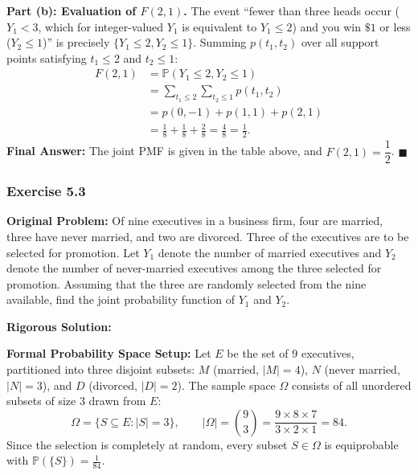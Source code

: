 \documentclass[11pt, letterpaper]{article}
\theoremstyle{definition}
\theoremstyle{remark}
\begin{document}
\textbf{Part (b): Evaluation of $F(2, 1)$.}
The event ``fewer than three heads occur ($Y_1 < 3$, which for integer-valued $Y_1$ is equivalent to $Y_1 \le 2$) and you win $\$1$ or less ($Y_2 \le 1$)'' is precisely $\{Y_1 \le 2, Y_2 \le 1\}$. Summing $p(t_1, t_2)$ over all support points satisfying $t_1 \le 2$ and $t_2 \le 1$:
\begin{align*}
    F(2, 1) &= \mathbb{P}(Y_1 \le 2, Y_2 \le 1) \\
    &= \sum_{t_1 \le 2} \sum_{t_2 \le 1} p(t_1, t_2) \\
    &= p(0, -1) + p(1, 1) + p(2, 1) \\
    &= \frac{1}{8} + \frac{1}{8} + \frac{2}{8} = \frac{4}{8} = \frac{1}{2}.
\end{align*}
\textbf{Final Answer:} The joint PMF is given in the table above, and $F(2, 1) = \dfrac{1}{2}$. $\blacksquare$

\bigskip

\subsubsection*{Exercise 5.3}
\textbf{Original Problem:} Of nine executives in a business firm, four are married, three have never married, and two are divorced. Three of the executives are to be selected for promotion. Let $Y_1$ denote the number of married executives and $Y_2$ denote the number of never-married executives among the three selected for promotion. Assuming that the three are randomly selected from the nine available, find the joint probability function of $Y_1$ and $Y_2$.

\textbf{Rigorous Solution:}

\textbf{Formal Probability Space Setup:} Let $E$ be the set of $9$ executives, partitioned into three disjoint subsets: $M$ (married, $|M| = 4$), $N$ (never married, $|N| = 3$), and $D$ (divorced, $|D| = 2$). The sample space $\Omega$ consists of all unordered subsets of size $3$ drawn from $E$:
\[
    \Omega = \{S \subseteq E : |S| = 3\}, \qquad |\Omega| = \binom{9}{3} = \frac{9 \times 8 \times 7}{3 \times 2 \times 1} = 84.
\]
Since the selection is completely at random, every subset $S \in \Omega$ is equiprobable with $\mathbb{P}(\{S\}) = \frac{1}{84}$.
\end{document}
